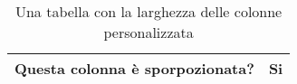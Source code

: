 \begin{table}[H]
\centering
\begin{tabular}{|p{2cm}|p{10cm}|}
\hline
Questa colonna è sporpozionata? & Si \\ \hline
\end{tabular}
\caption{Una tabella con la larghezza delle colonne personalizzata}
\label{tab:es_spoporzionata}
\end{table}
